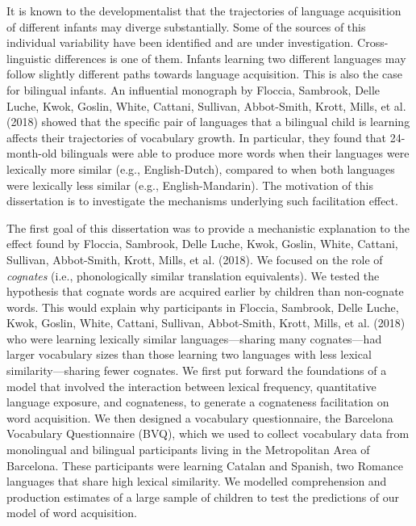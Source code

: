 \documentclass[
  12pt,
  b5paperpaper,
  twoside]{scrreprt}
\begin{document}
\begin{spacing}{1.5}
{It is known to the developmentalist that the trajectories of language
acquisition of different infants may diverge substantially. Some of the
sources of this individual variability have been identified and are
under investigation. Cross-linguistic differences is one of them.
Infants learning two different languages may follow slightly different
paths towards language acquisition. This is also the case for bilingual
infants. An influential monograph by Floccia, Sambrook, Delle Luche,
Kwok, Goslin, White, Cattani, Sullivan, Abbot-Smith, Krott, Mills, et
al. (2018) showed that the specific pair of languages that a bilingual
child is learning affects their trajectories of vocabulary growth. In
particular, they found that 24-month-old bilinguals were able to produce
more words when their languages were lexically more similar (e.g.,
English-Dutch), compared to when both languages were lexically less
similar (e.g., English-Mandarin). The motivation of this dissertation is
to investigate the mechanisms underlying such facilitation effect.

The first goal of this dissertation was to provide a mechanistic
explanation to the effect found by Floccia, Sambrook, Delle Luche, Kwok,
Goslin, White, Cattani, Sullivan, Abbot-Smith, Krott, Mills, et al.
(2018). We focused on the role of \emph{cognates} (i.e., phonologically
similar translation equivalents). We tested the hypothesis that cognate
words are acquired earlier by children than non-cognate words. This
would explain why participants in Floccia, Sambrook, Delle Luche, Kwok,
Goslin, White, Cattani, Sullivan, Abbot-Smith, Krott, Mills, et al.
(2018) who were learning lexically similar languages---sharing many
cognates---had larger vocabulary sizes than those learning two languages
with less lexical similarity---sharing fewer cognates. We first put
forward the foundations of a model that involved the interaction between
lexical frequency, quantitative language exposure, and cognateness, to
generate a cognateness facilitation on word acquisition. We then
designed a vocabulary questionnaire, the Barcelona Vocabulary
Questionnaire (BVQ), which we used to collect vocabulary data from
monolingual and bilingual participants living in the Metropolitan Area
of Barcelona. These participants were learning Catalan and Spanish, two
Romance languages that share high lexical similarity. We modelled
comprehension and production estimates of a large sample of children to
test the predictions of our model of word acquisition.

}
\end{spacing}
\end{document}
